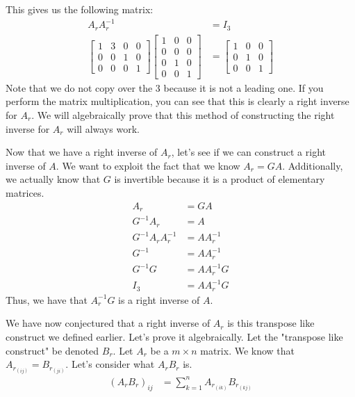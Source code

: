 \begin{example}
    This gives us the following matrix:
        \begin{align*}
        A_rA_r^{-1}&=I_3\\
        \begin{bmatrix}
        1 & 3 & 0 & 0\\
        0 & 0 & 1 & 0\\
        0 & 0 & 0 &1
    \end{bmatrix}\begin{bmatrix}
        1 & 0 & 0\\
        0 & 0 & 0\\
        0 & 1 & 0\\
        0 & 0 & 1
    \end{bmatrix}&=\begin{bmatrix}
        1 & 0 & 0\\
        0 & 1 & 0\\
        0 & 0 & 1
    \end{bmatrix}
    \end{align*}
    Note that we do not copy over the $3$ because it is not a leading one. If you perform the matrix multiplication, you can see that this is clearly a right inverse for $A_r$. We will algebraically prove that this method of constructing the right inverse for $A_r$ will always work.

    Now that we have a right inverse of $A_r$, let's see if we can construct a right inverse of $A$. We want to exploit the fact that we know $A_r=GA$. Additionally, we actually know that $G$ is invertible because it is a product of elementary matrices.
    \begin{align*}
        A_r&=GA\\
        G^{-1}A_r&=A\\
        G^{-1}A_rA_r^{-1}&=AA_r^{-1}\\
        G^{-1}&=AA_r^{-1}\\
        G^{-1}G&=AA_r^{-1}G\\
        I_3&=AA_r^{-1}G
    \end{align*}
    Thus, we have that $A_r^{-1}G$ is a right inverse of $A$.
\end{example}
We have now conjectured that a right inverse of $A_r$ is this transpose like construct we defined earlier. Let's prove it algebraically. Let the "transpose like construct" be denoted $B_r$. Let $A_r$ be a $m\times n$ matrix. We know that $A_{r_{(ij)}}=B_{r_{(ji)}}$. Let's consider what $A_rB_r$ is.
\begin{align*}
    (A_rB_r)_{ij}&=\sum_{k=1}^n A_{r_{(ik)}}B_{r_{(kj)}}
\end{align*}
